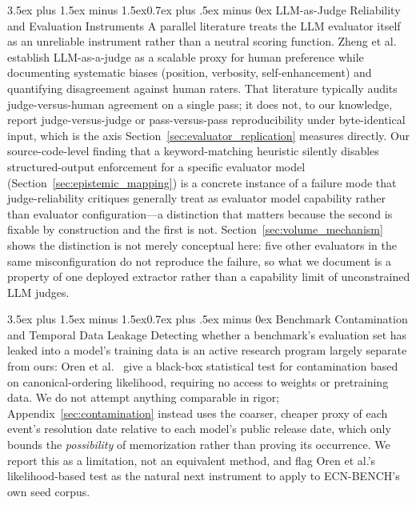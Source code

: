 \documentclass[11pt,journal,onecolumn]{IEEEtran}
\makeatletter
\renewcommand\subsection{\@startsection{subsection}{2}{\z@}%
  {3.5ex plus 1.5ex minus 1.5ex}{0.7ex plus .5ex minus 0ex}%
  {\normalfont\normalsize\bfseries}}
\makeatother
\begin{document}
\subsection{LLM-as-Judge Reliability and Evaluation Instruments}
\label{sec:related_judge}
A parallel literature treats the LLM evaluator itself as an unreliable instrument rather than a neutral scoring function. Zheng et al.~\cite{zheng2023judging} establish LLM-as-a-judge as a scalable proxy for human preference while documenting systematic biases (position, verbosity, self-enhancement) and quantifying disagreement against human raters. That literature typically audits judge-versus-human agreement on a single pass; it does not, to our knowledge, report judge-versus-judge or pass-versus-pass reproducibility under byte-identical input, which is the axis Section~\ref{sec:evaluator_replication} measures directly. Our source-code-level finding that a keyword-matching heuristic silently disables structured-output enforcement for a specific evaluator model (Section~\ref{sec:epistemic_mapping}) is a concrete instance of a failure mode that judge-reliability critiques generally treat as evaluator model capability rather than evaluator configuration---a distinction that matters because the second is fixable by construction and the first is not. Section~\ref{sec:volume_mechanism} shows the distinction is not merely conceptual here: five other evaluators in the same misconfiguration do not reproduce the failure, so what we document is a property of one deployed extractor rather than a capability limit of unconstrained LLM judges.

\subsection{Benchmark Contamination and Temporal Data Leakage}
\label{sec:related_contamination}
Detecting whether a benchmark's evaluation set has leaked into a model's training data is an active research program largely separate from ours: Oren et al.~\cite{oren2024proving} give a black-box statistical test for contamination based on canonical-ordering likelihood, requiring no access to weights or pretraining data. We do not attempt anything comparable in rigor; Appendix~\ref{sec:contamination} instead uses the coarser, cheaper proxy of each event's resolution date relative to each model's public release date, which only bounds the \emph{possibility} of memorization rather than proving its occurrence. We report this as a limitation, not an equivalent method, and flag Oren et al.'s likelihood-based test as the natural next instrument to apply to ECN-BENCH's own seed corpus.
\end{document}
